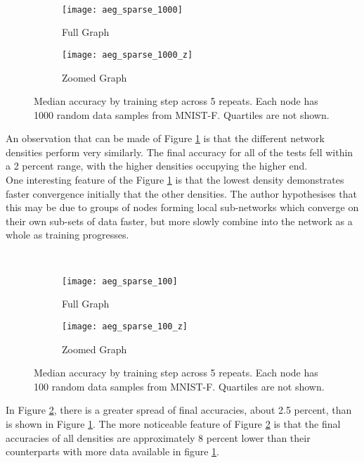 \begin{figure}[H] 
	 \\
	\begin{subfigure}{0.49\textwidth}
		\texttt{[image: aeg\_sparse\_1000]}
		\caption{Full Graph}
	\end{subfigure}
	\begin{subfigure}{0.49\textwidth}
		\texttt{[image: aeg\_sparse\_1000\_z]}
		\caption{Zoomed Graph}
	\end{subfigure}
	\caption{Median accuracy by training step across 5 repeats. Each node has 1000 random data samples from MNIST-F. Quartiles are not shown.}
	\label{aeg4}
\end{figure}

An observation that can be made of Figure \ref{aeg4} is that the different network densities perform very similarly. The final accuracy for all of the tests fell within a 2 percent range,  with the higher densities occupying the higher end. \\

One interesting feature of the Figure \ref{aeg4} is that the lowest density demonstrates faster convergence initially that the other densities. The author hypothesises that this may be due to groups of nodes forming local sub-networks which converge on their own sub-sets of data faster, but more slowly combine into the network as a whole as training progresses.

\begin{figure}[H] 
	 \\
	\begin{subfigure}{0.49\textwidth}
		\texttt{[image: aeg\_sparse\_100]}
		\caption{Full Graph}
	\end{subfigure}
	\begin{subfigure}{0.49\textwidth}
		\texttt{[image: aeg\_sparse\_100\_z]}
		\caption{Zoomed Graph}
	\end{subfigure}
	\caption{Median accuracy by training step across 5 repeats. Each node has 100 random data samples from MNIST-F. Quartiles are not shown.}
	\label{aeg5}
\end{figure}

In Figure \ref{aeg5}, there is a greater spread of final accuracies, about 2.5 percent, than is shown in Figure \ref{aeg4}. The more noticeable feature of Figure \ref{aeg5} is that the final accuracies of all densities are approximately 8 percent lower than their counterparts with more data available in figure \ref{aeg4}.

